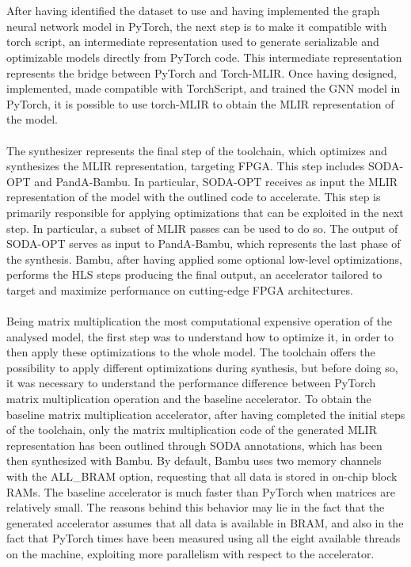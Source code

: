 \documentclass{article}
\begin{document}
\\
\\
\noindent
After having identified the dataset to use and having implemented the graph neural network model in PyTorch, the next step is to make it compatible with torch script, an intermediate representation used to generate serializable and optimizable models directly from PyTorch code. 
This intermediate representation represents the bridge between PyTorch and Torch-MLIR.
Once having designed, implemented, made compatible with TorchScript, and trained the GNN model in PyTorch, it is possible to use torch-MLIR to obtain the MLIR representation of the model.
\\
\\
\noindent
The synthesizer represents the final step of the toolchain, which optimizes and synthesizes the MLIR representation, targeting FPGA. This step includes SODA-OPT and PandA-Bambu.
In particular, SODA-OPT receives as input the MLIR representation of the model with the outlined code to accelerate. This step is primarily responsible for applying optimizations that can be exploited in the next step. In particular, a subset of MLIR passes can be used to do so. 
The output of SODA-OPT serves as input to PandA-Bambu, which represents the last phase of the synthesis. Bambu, after having applied some optional low-level optimizations, performs the HLS steps producing the final output, an accelerator tailored to target and maximize performance on cutting-edge FPGA architectures. 
\\
\\
\noindent
Being matrix multiplication the most computational expensive operation of the analysed model, the first step was to understand how to optimize it, in order to then apply these optimizations to the whole model.
The toolchain offers the possibility to apply different optimizations during synthesis, but before doing so, it was necessary to understand the performance difference between PyTorch matrix multiplication operation and the baseline accelerator. 
To obtain the baseline matrix multiplication accelerator, after having completed the initial steps of the toolchain, only the matrix multiplication code of the generated MLIR representation has been outlined through SODA annotations, which has been then synthesized with Bambu.
By default, Bambu uses two memory channels with the ALL\_BRAM option, requesting that all data is stored in on-chip block RAMs. 
The baseline accelerator is much faster than PyTorch when matrices are relatively small. 
The reasons behind this behavior may lie in the fact that the generated accelerator assumes that all data is available in BRAM, and also in the fact that PyTorch times have been measured using all the eight available threads on the machine, exploiting more parallelism with respect to the accelerator.
\end{document}
